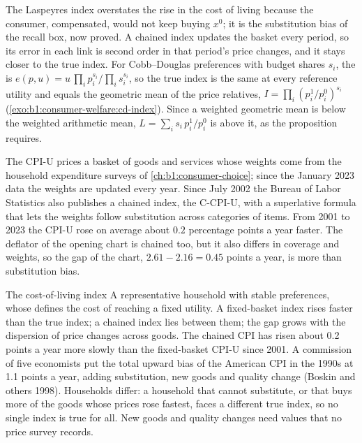 The Laspeyres index overstates the rise in the cost of living because the
consumer, compensated, would not keep buying $x^0$; it is the
substitution bias of the recall box, now proved. A chained index updates
the basket every period, so its error in each link is second order in that
period's price changes, and it stays closer to the true index. For
Cobb--Douglas preferences with budget shares $s_i$, the  is $e(p, u) = u\,\prod_i p_i^{s_i}/\prod_i s_i^{s_i}$, so the true index
is the same at every reference utility and equals the geometric mean of
the price relatives, $I = \prod_i (p_i^1/p_i^0)^{s_i}$
(\cref{exo:b1:consumer-welfare:cd-index}). Since a weighted geometric mean is
below the weighted arithmetic mean, $L = \sum_i s_i\,p_i^1/p_i^0$ is above it,
as the proposition requires.

\begin{measure}
The CPI-U prices a basket of goods and services whose weights come from the
household expenditure surveys of \cref{ch:b1:consumer-choice}; since the
January 2023 data the weights are updated every year. Since July 2002 the
Bureau of Labor Statistics also publishes a chained index, the C-CPI-U,
with a superlative formula that lets the weights follow substitution across
categories of items. From 2001 to 2023 the CPI-U rose on average about
$0.2$ percentage points a year faster. %
The deflator of the opening chart is chained too, but it also differs in
coverage and weights, so the gap of the chart, $2.61 - 2.16 = 0.45$ points a
year, is more than substitution bias. %
\end{measure}

\begin{model}{The cost-of-living index}
\assumes A representative household with stable preferences, whose
 defines the cost of reaching a fixed utility.
\predicts A fixed-basket index rises faster than the true index; a chained
index lies between them; the gap grows with the dispersion of price
changes across goods.
\tested The chained CPI has risen about 0.2 points a year more slowly than
the fixed-basket CPI-U since 2001. %
A commission of five economists put the total upward bias of the American
CPI in the 1990s at 1.1 points a year, adding substitution, new goods
and quality change (Boskin and others 1998). %
\breaks Households differ: a household that cannot substitute, or that buys
more of the goods whose prices rose fastest, faces a different true index,
so no single index is true for all. New goods and quality changes need
values that no price survey records.
\end{model}

